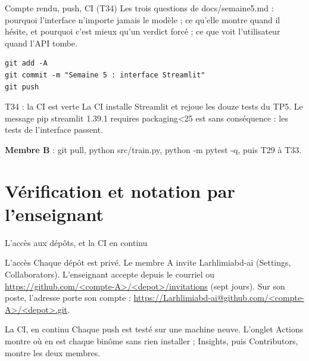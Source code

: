 \documentclass[aspectratio=169,11pt]{beamer}
\newcommand{\co}[1]{{\ttfamily\hyphenchar\font=45\relax #1}}
\begin{document}
\begin{frame}[fragile]{Compte rendu, push, CI (T34)}
\small Les trois questions de \co{docs/semaine5.md} : pourquoi l'interface n'importe jamais le modèle ; ce
qu'elle montre quand il hésite, et pourquoi c'est mieux qu'un verdict forcé ; ce que voit l'utilisateur quand
l'API tombe.
\begin{lstlisting}
git add -A
git commit -m "Semaine 5 : interface Streamlit"
git push
\end{lstlisting}
\begin{exampleblock}{T34 : la CI est verte}
La CI installe Streamlit et rejoue les douze tests du TP5. Le message pip
\co{streamlit 1.39.1 requires packaging<25} est sans conséquence : les tests de l'interface passent.
\end{exampleblock}
\small \textbf{Membre B} : \co{git pull}, \co{python src/train.py}, \co{python -m pytest -q}, puis T29 à T33.
\end{frame}

\section{Vérification et notation par l'enseignant}

\begin{frame}{L'accès aux dépôts, et la CI en continu}
\begin{block}{L'accès}
\small Chaque dépôt est privé. Le membre A invite \co{Larhlimiabd-ai} (Settings, Collaborators). L'enseignant
accepte depuis le courriel ou \url{https://github.com/<compte-A>/<depot>/invitations} (sept jours). Sur son
poste, l'adresse porte son compte : \url{https://Larhlimiabd-ai@github.com/<compte-A>/<depot>.git}.
\end{block}
\begin{block}{La CI, en continu}
\small Chaque push est testé sur une machine neuve. L'onglet Actions montre où en est chaque binôme sans rien
installer ; Insights, puis Contributors, montre les deux membres.
\end{block}
\end{frame}
\end{document}
